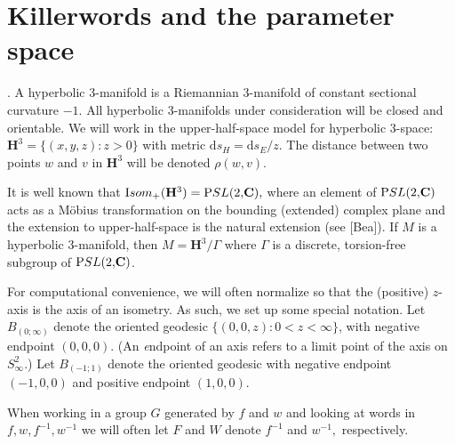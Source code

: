 \def\Relength{{\textrm Relength}}
\def\length{{\textrm length}}
\def\Arccosh{{\textrm Arccosh}}
\def\trace{{\textrm trace}}
\def\distance{{\textrm distance}}

\vglue-8pt
\chapter{Killerwords and the parameter space}
\vglue-4pt

\begin{notationsandconventions}\label{GMT 1.1}.
A hyperbolic $3$-manifold is a Riemannian $3$-manifold of constant sectional curvature $-1$.  All hyperbolic $3$-manifolds under
consideration will be closed and orientable. We will work in the upper-half-space model for
hyperbolic 3-space:  ${\mathbf H}^3 = \{(x,y,z): z > 0\}$ with 
metric ${\mathrm ds_H} = {\mathrm ds_E}/z.$ The distance between two points $w$ and $v$ in ${\mathbf H}^3$ will be denoted $\rho(w,v).$

It is well known that  
${\textrm Isom}_+({\mathbf H}^3) = {\textrm PSL(2,}{\mathbf C}),$  
where an element of
${\textrm PSL(2,}{\mathbf C})$ acts as a M\"obius transformation on the bounding (extended) complex plane and the extension to upper-half-space is the natural extension
 (see [Bea]).  
If $M$ is a hyperbolic $3$-manifold, then $M={\mathbf H}^3/\Gamma$ where $\Gamma$ is a 
discrete, torsion-free subgroup of ${\textrm PSL(2,}{\mathbf C})$.   

For computational convenience, we will often normalize so that the (positive) $z$-axis is the axis of an isometry.  As such, we set up some special notation.
Let $B_{(0;\infty)}$ denote the oriented geodesic $\{(0,0,z): 0< z < \infty \}$,
with negative endpoint $(0,0,0).$  (An {\textit endpoint} of an axis refers to a limit point of the axis on $S^2_{\infty}$.) Let $B_{(-1;1)}$ denote the
oriented geodesic with negative endpoint $(-1,0,0)$ and positive endpoint $(1,0,0)$.

When working in a group $G$ generated by $f$ and $w$ and looking 
at words in $f,w, f^{-1}, w^{-1}$ we will often let $F$ and $W$ denote
$f^{-1}$ and $w^{-1},$ respectively.
\end{notationsandconventions}

